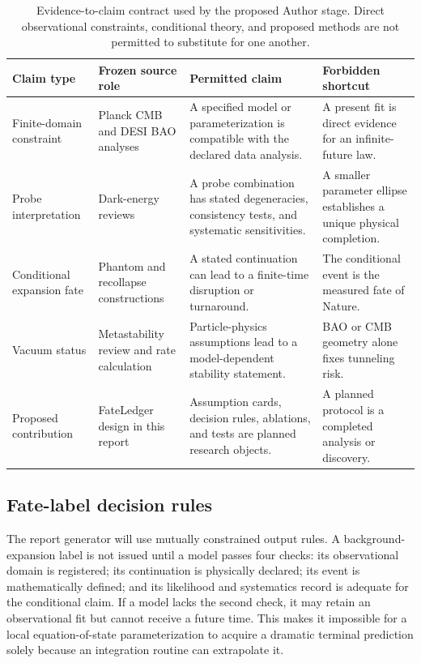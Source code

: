 \documentclass[conference]{IEEEtran}
\begin{document}
\begin{table}[t]
\caption{Evidence-to-claim contract used by the proposed Author stage. Direct observational constraints, conditional theory, and proposed methods are not permitted to substitute for one another.}
\label{tab:traceability}
\centering
\footnotesize
\setlength{\tabcolsep}{3pt}
\begin{tabular}{p{} p{} p{} p{}}
\hline
\textbf{Claim type} & \textbf{Frozen source role} & \textbf{Permitted claim} & \textbf{Forbidden shortcut}\\
\hline
Finite-domain constraint & Planck CMB and DESI BAO analyses \cite{planck2018,desi2025} & A specified model or parameterization is compatible with the declared data analysis. & A present fit is direct evidence for an infinite-future law.\\
Probe interpretation & Dark-energy reviews \cite{huterer2018,escamilla2024} & A probe combination has stated degeneracies, consistency tests, and systematic sensitivities. & A smaller parameter ellipse establishes a unique physical completion.\\
Conditional expansion fate & Phantom and recollapse constructions \cite{caldwell2003,kallosh2003} & A stated continuation can lead to a finite-time disruption or turnaround. & The conditional event is the measured fate of Nature.\\
Vacuum status & Metastability review and rate calculation \cite{markkanen2018,chigusa2018} & Particle-physics assumptions lead to a model-dependent stability statement. & BAO or CMB geometry alone fixes tunneling risk.\\
Proposed contribution & FateLedger design in this report & Assumption cards, decision rules, ablations, and tests are planned research objects. & A planned protocol is a completed analysis or discovery.\\
\hline
\end{tabular}
\end{table}

\subsection{Fate-label decision rules}

The report generator will use mutually constrained output rules. A background-expansion label is not issued until a model passes four checks: its observational domain is registered; its continuation is physically declared; its event is mathematically defined; and its likelihood and systematics record is adequate for the conditional claim. If a model lacks the second check, it may retain an observational fit but cannot receive a future time. This makes it impossible for a local equation-of-state parameterization to acquire a dramatic terminal prediction solely because an integration routine can extrapolate it.
\end{document}
